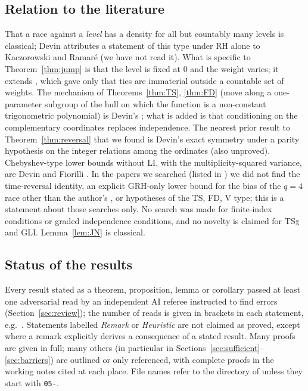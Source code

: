 \subsection{Relation to the literature}
That a race against a \emph{level} has a density for all but countably many levels is classical; Devin \cite{Devin} attributes a statement of this type under RH alone to Kaczorowski and Ramar\'e \cite[Theorem~3]{KR} (we have not read it). What is specific to Theorem~\ref{thm:jump} is that the level is fixed at $0$ and the weight varies; it extends \cite[Theorem~7.1]{GO}, which gave only that ties are immaterial outside a countable set of weights. The mechanism of Theorems~\ref{thm:TS}, \ref{thm:FD} (move along a one-parameter subgroup of the hull on which the function is a non-constant trigonometric polynomial) is Devin's \cite{Devin}; what is added is that conditioning on the complementary coordinates replaces independence. The nearest prior result to Theorem~\ref{thm:reversal} that we found is Devin's exact symmetry \cite[Theorem~2.3]{Devin} under a parity hypothesis on the integer relations among the ordinates (also unproved). Chebyshev-type lower bounds without LI, with the multiplicity-squared variance, are Devin \cite[Corollary~5.8]{Devin} and Fiorilli \cite[Lemma~2.7]{Fiorilli}. In the papers we searched (listed in ) we did not find the time-reversal identity, an explicit GRH-only lower bound for the bias of the $q=4$ race other than the author's \cite{GO}, or hypotheses of the TS, FD, V type; this is a statement about those searches only. No search was made for finite-index conditions or graded independence conditions, and no novelty is claimed for TS$_\mathbb Z$ and GLI. Lemma~\ref{lem:JN} is classical.

\subsection{Status of the results}
Every result stated as a theorem, proposition, lemma or corollary passed at least one adversarial read by an independent AI referee instructed to find errors (Section~\ref{sec:review}); the number of reads is given in brackets in each statement, e.g.\ . Statements labelled \emph{Remark} or \emph{Heuristic} are not claimed as proved, except where a remark explicitly derives a consequence of a stated result. Many proofs are given in full; many others (in particular in Sections~\ref{sec:sufficient}--\ref{sec:barriers}) are outlined or only referenced, with complete proofs in the working notes cited at each place. File names refer to the directory \repo{} of \cite{Repo} unless they start with \texttt{05-}.

